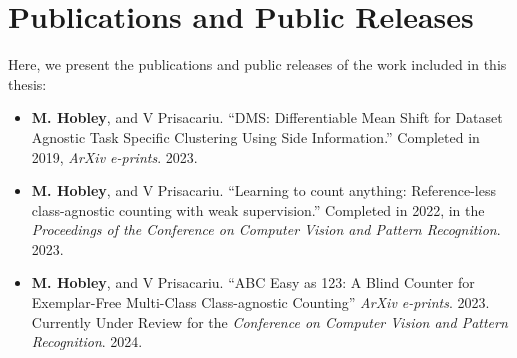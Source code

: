 \documentclass[../thesis.tex]{subfiles}
\begin{document}
\section{Publications and Public Releases}
 Here, we present the publications and public releases of the work included in this thesis:

\begin{itemize}
    \item \textbf{M. Hobley}, and V Prisacariu. ``DMS: Differentiable Mean Shift for Dataset Agnostic Task Specific Clustering Using Side Information.'' Completed in 2019, \textit{ArXiv e-prints}. 2023.
    \item \textbf{M. Hobley}, and V Prisacariu. ``Learning to count anything: Reference-less class-agnostic counting with weak supervision.'' Completed in 2022, in the \textit{Proceedings of the Conference on Computer Vision and Pattern Recognition}. 2023.
    \item \textbf{M. Hobley}, and V Prisacariu. ``ABC Easy as 123: A Blind Counter for Exemplar-Free Multi-Class Class-agnostic Counting'' \textit{ArXiv e-prints}. 2023. Currently Under Review for the \textit{Conference on Computer Vision and Pattern Recognition}. 2024.
\end{itemize}
\end{document}
